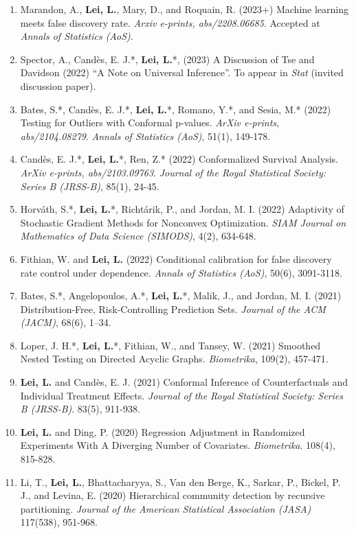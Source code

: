 \documentclass{article}
\newcommand{\red}[1]{{\color{red} #1}}
\begin{document}
\begin{enumerate}
\item \red{Marandon, A., \textbf{Lei, L.}, Mary, D., and Roquain, R. (2023+) Machine learning meets false discovery rate. \emph{Arxiv e-prints, abs/2208.06685}. Accepted at \emph{Annals of Statistics (AoS)}.}
\item \red{Spector, A., Cand\`{e}s, E. J.*, \textbf{Lei, L.}*, (2023) A Discussion of Tse and Davidson (2022) “A Note on Universal Inference”. To appear in \emph{Stat} (invited discussion paper).}
\item Bates, S.*, Cand\`{e}s, E. J.*, \textbf{Lei, L.}*, Romano, Y.*, and Sesia, M.* (2022) Testing for Outliers with Conformal p-values. \emph{ArXiv e-prints, abs/2104.08279}. \emph{Annals of Statistics (AoS)}, 51(1), 149-178.  
\item Cand\`{e}s, E. J.*, \textbf{Lei, L.}*, Ren, Z.* (2022) Conformalized Survival Analysis. \emph{ArXiv e-prints, abs/2103.09763}. \emph{Journal of the Royal Statistical Society: Series B (JRSS-B)}, 85(1), 24-45.
\item Horv\'{a}th, S.*, \textbf{Lei, L.}*, Richt\'{a}rik, P., and Jordan, M. I. (2022) Adaptivity of Stochastic Gradient Methods for Nonconvex Optimization. \emph{SIAM Journal on Mathematics of Data Science (SIMODS)}, 4(2), 634-648.
\item Fithian, W. and \textbf{Lei, L.} (2022) Conditional calibration for false discovery rate control under dependence. \emph{Annals of Statistics (AoS)}, 50(6), 3091-3118.
\item Bates, S.*, Angelopoulos, A.*, \textbf{Lei, L.}*, Malik, J., and Jordan, M. I. (2021) Distribution-Free, Risk-Controlling Prediction Sets. \emph{Journal of the ACM (JACM)}, 68(6), 1–34.
\item Loper, J. H.*, \textbf{Lei, L.}*, Fithian, W., and Tansey, W. (2021) Smoothed Nested Testing on Directed Acyclic Graphs. \emph{Biometrika}, 109(2), 457-471.
\item \textbf{Lei, L.} and Cand\`{e}s, E. J. (2021) Conformal Inference of Counterfactuals and Individual Treatment Effects. \emph{Journal of the Royal Statistical Society: Series B (JRSS-B)}. 83(5), 911-938.
\item \textbf{Lei, L.} and Ding, P. (2020) Regression Adjustment in Randomized Experiments With A Diverging Number of Covariates. \emph{Biometrika}. 108(4), 815-828.
\item Li, T., \textbf{Lei, L.}, Bhattacharyya, S., Van den Berge, K., Sarkar, P., Bickel, P. J., and Levina, E. (2020) Hierarchical community detection by recursive partitioning. \emph{Journal of the American Statistical Association (JASA)} 117(538), 951-968.

\end{enumerate}
\end{document}
